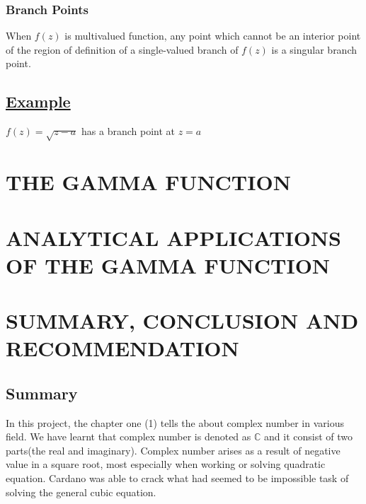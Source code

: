 \documentclass[11pt]{report}
\newcommand{\ubt}[1]{\textbf{\underline{#1}}}
\newcommand{\dsp}{\displaystyle}
\newcommand{\complex}{\mathbb{C}}
\newcommand{\example}[1]{\section*{\ubt{Example #1}}}
\begin{document}
	\subsection{Branch Points}
	When $f(z)$ is multivalued function, any point which cannot be an interior point of the region of definition of a single-valued branch of $f(z)$ is a singular branch point.
	\example{}
	$\dsp f(z)=\sqrt{z-a}$ has a branch point at $z=a$
	
	
	
	
	
	
	
	
	
	
	
	
	
	
	
	
	
	
	
	
	
	
	
	
	
	
	
	
	
	
	
	
	
	
	
	
	
	
	
	
	
	
	
	\chapter{THE GAMMA FUNCTION}
	
	

	
	\chapter{ANALYTICAL APPLICATIONS OF THE GAMMA FUNCTION}
	


	
	\chapter{SUMMARY, CONCLUSION AND RECOMMENDATION}
	\section{Summary}
	In this project, the chapter one (1) tells the about complex number in various field. We have learnt that complex number is denoted as $\complex$ and it consist of two parts(the real and imaginary). Complex number arises as a result of negative value in a square root, most especially when working or solving quadratic equation. Cardano was able to crack what had seemed to be impossible task of solving the general cubic equation.\\
	
\end{document}
